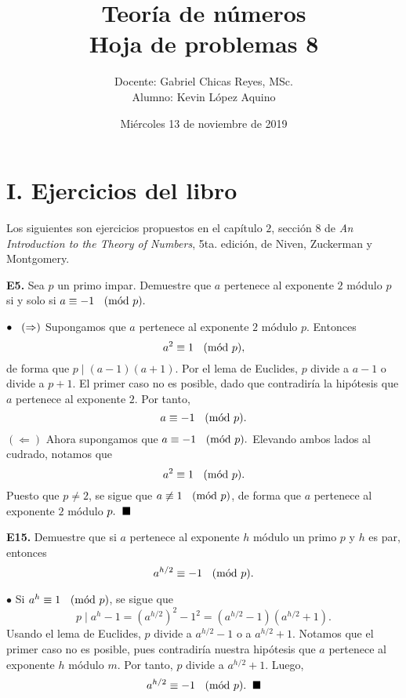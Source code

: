 \documentclass{article}
\newcommand{\Mod}[1]{\ \hspace{0.2cm} (\mathrm{m\acute{o}d}\ #1)}
\begin{document}
\date{Miércoles 13 de noviembre de 2019}
\title{ \textbf{Teoría de números } \\
Hoja de problemas 8}
\author{Docente: Gabriel Chicas Reyes, MSc.\\ 
				Alumno: Kevin López Aquino }
\maketitle	

\section*{ I. Ejercicios del libro}

Los siguientes son ejercicios propuestos en el capítulo $2$, sección $8$ de \textit{An Introduction to the Theory of Numbers}, 5ta. edición, de Niven, Zuckerman y Montgomery. 
\vspace{5mm}
\begin{mybox}
	\textbf{E5. } Sea $p$ un primo impar. Demuestre que $a$ pertenece al exponente $2$   módulo $p$ si y solo si $a \equiv -1 \Mod{p}.$
\end{mybox}	

$\bullet \hspace{0.3cm} (\Rightarrow)$ Supongamos que $a$ pertenece al exponente $2$ módulo $p$. Entonces
$$ a^{2} \equiv 1 \Mod{p}, $$ 
de forma que $p \mid (a - 1)(a + 1)$. Por el lema de Euclides, $p$ divide a $a -1$ o divide a $p + 1$. El primer caso no es posible, dado que contradiría la hipótesis que $a$ pertenece al exponente $2$. Por tanto,
$$ a \equiv -1 \Mod{p}. $$ 
$(\Leftarrow)$ Ahora supongamos que $ a \equiv -1 \Mod{p}. $ Elevando ambos lados al cudrado, notamos que
$$a^2 \equiv 1 \Mod{p}. $$
Puesto que $p \neq 2$, se sigue que 	$a \not \equiv 1 \Mod{p}$, de forma que $a$ pertenece al exponente $2$ módulo $p. \hspace{0.2cm} \blacksquare$ 

\newpage

\begin{mybox}
	\textbf{E15. } Demuestre que si $a$ pertenece al exponente $h$ módulo un primo $p$ y $h$ es par, entonces 
	$$ a^{h/2} \equiv -1  \Mod{p} .$$
\end{mybox}	
$\bullet $ Si $a^h \equiv 1 \Mod{p}$, se sigue que 
$$ p \mid a^h - 1 = (a^{h/2})^2 - 1^2 = (a^{h/2} - 1)(a^{h/2} + 1). $$
Usando el lema de Euclides, $p$ divide a $a^{h/2} - 1$ o a $a^{h/2} + 1$. Notamos que el primer caso no es posible, pues contradiría nuestra hipótesis que $a$ pertenece al exponente $h$ módulo $m$. Por tanto, $p$ divide a  $a^{h/2} + 1$. Luego,
$$ a^{h/2} \equiv -1 \Mod{p}. \hspace{0.2cm} \blacksquare $$
\end{document}
